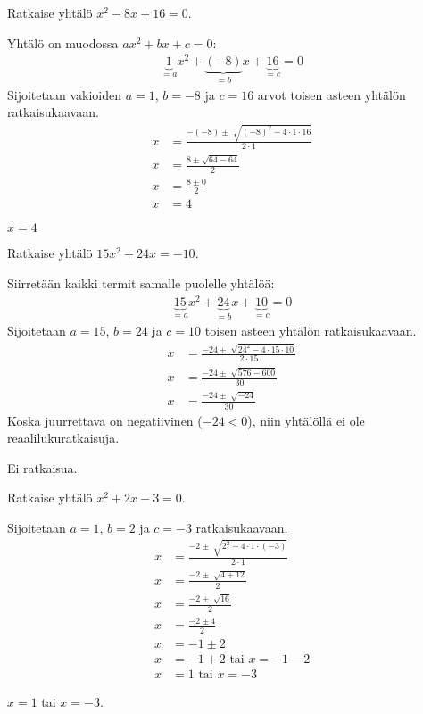 \begin{esimerkki}
Ratkaise yhtälö $x^2-8x+16=0$.
	\begin{esimratk}
Yhtälö on muodossa $ax^2+bx+c=0$:
\begin{align*}
\underbrace{1}_{=a}x^2 +\underbrace{(-8)}_{=b}x+\underbrace{16}_{=c}=0
\end{align*}
Sijoitetaan vakioiden $a=1$, $b=-8$ ja $c=16$ arvot toisen asteen yhtälön
ratkaisukaavaan.
\begin{align*}
x&=\frac{-(-8)\pm \sqrt[]{(-8)^2-4\cdot 1 \cdot 16}}{2 \cdot 1} \\
x&=\frac{8 \pm \sqrt{64- 64}}{2} \\
x&=\frac{8 \pm 0}{2} \\
x&=4
\end{align*}
	\end{esimratk}
\begin{esimvast}
$x=4$
\end{esimvast}
\end{esimerkki}

\begin{esimerkki}
Ratkaise yhtälö $15x^2+24x=-10$.
\begin{esimratk}
Siirretään kaikki termit samalle puolelle yhtälöä:
\begin{align*}
\underbrace{15}_{=a}x^2+\underbrace{24}_{=b}x+\underbrace{10}_{=c}=0
\end{align*}
Sijoitetaan  $a=15$, $b=24$ ja $c=10$ toisen asteen yhtälön ratkaisukaavaan.
\begin{align*}
x&=\frac{-24 \pm \sqrt[]{24^2-4 \cdot 15 \cdot 10}}{2 \cdot 15} \\
x&=\frac{-24 \pm \sqrt[]{576-600}}{30} \\
x&=\frac{-24 \pm \sqrt[]{-24}}{30}
\end{align*}
Koska juurrettava on negatiivinen ($-24<0$), niin yhtälöllä ei ole reaalilukuratkaisuja.
\end{esimratk}
\begin{esimvast}
Ei ratkaisua.
\end{esimvast}
\end{esimerkki}

\newpage %
\begin{esimerkki}
Ratkaise yhtälö $x^2+2x-3=0$.
\begin{esimratk}
Sijoitetaan  $a=1$, $b=2$ ja $c=-3$ ratkaisukaavaan.
\begin{align*}
x&=\frac{-2 \pm \sqrt[]{2^2-4 \cdot 1 \cdot (-3)}}{2 \cdot 1} \\
x&=\frac{-2 \pm \sqrt[]{4+12}}{2} \\
x&=\frac{-2 \pm \sqrt[]{16}}{2} \\
x&=\frac{-2 \pm 4}{2} \\
x&=-1 \pm 2 \\
x&= -1+2 \text{ tai } x = -1-2 \\
x&=1 \text{ tai } x=-3 
\end{align*}
\end{esimratk}
\begin{esimvast}
$x=1$ tai $x=-3$.
\end{esimvast}
\end{esimerkki}

